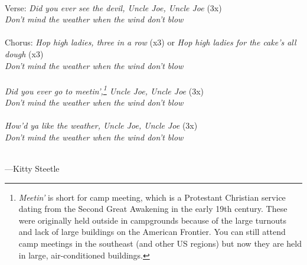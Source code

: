 \documentclass[10pt]{article}
\begin{document}
{\begin{minipage}{7.0in}
{\parindent0pt
  \raggedright
  ~\\
Verse: \textit{Did you ever see the devil, Uncle Joe, Uncle Joe} (3x) \\
\textit{Don't mind the weather when the wind don't blow} \\
  ~\\
Chorus: \textit{Hop high ladies, three in a row} (x3) or \textit{Hop high ladies for the cake's all dough} (x3) \\
\textit{Don't mind the weather when the wind don't blow} \\
  ~\\
\textit{Did you ever go to meetin',\footnote{\textit{Meetin'} is short for camp meeting, which is a Protestant Christian service dating from the Second Great Awakening in the early 19th century. These were originally held outside in campgrounds because of the large turnouts and lack of large buildings on the American Frontier. You can still attend camp meetings in the southeast (and other US regions) but now they are held in large, air-conditioned buildings.} Uncle Joe, Uncle Joe} (3x) \\
\textit{Don't mind the weather when the wind don't blow} \\
  ~\\
\textit{How'd ya like the weather, Uncle Joe, Uncle Joe} (3x) \\
\textit{Don't mind the weather when the wind don't blow} \\
  ~\\
}

---Kitty Steetle
  \end{minipage}
}
\end{document}
